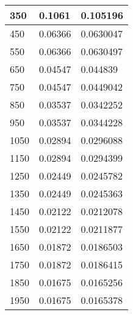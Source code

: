 \begin{appendix}
\begin{minipage}{0.49\textwidth}
\begin{tabular}{|l|l|l|}
		350      & 0.1061  & 0.105196  \\ \hline
		450      & 0.06366 & 0.0630047 \\ \hline
		550      & 0.06366 & 0.0630497 \\ \hline
		650      & 0.04547 & 0.044839  \\ \hline
		750      & 0.04547 & 0.0449042 \\ \hline
		850      & 0.03537 & 0.0342252 \\ \hline
		950      & 0.03537 & 0.0344228 \\ \hline
		1050     & 0.02894 & 0.0296088 \\ \hline
		1150     & 0.02894 & 0.0294399 \\ \hline
		1250     & 0.02449 & 0.0245782 \\ \hline
		1350     & 0.02449 & 0.0245363 \\ \hline
		1450     & 0.02122 & 0.0212078 \\ \hline
		1550     & 0.02122 & 0.0211877 \\ \hline
		1650     & 0.01872 & 0.0186503 \\ \hline
		1750     & 0.01872 & 0.0186415 \\ \hline
		1850     & 0.01675 & 0.0165256 \\ \hline
		1950     & 0.01675 & 0.0165378 \\ \hline
	\end{tabular}
\label{tab:Phas_90_Vergleich}
\end{minipage}


\end{appendix}
